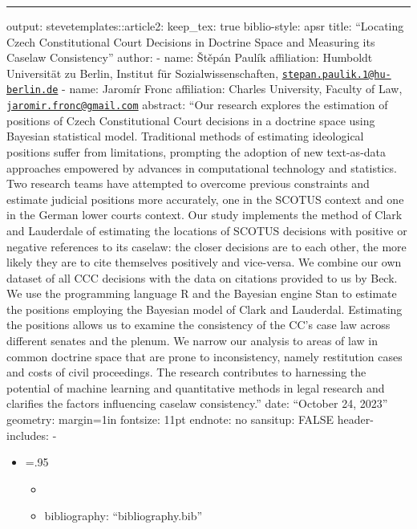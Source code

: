 \documentclass[
]{article}
\author{}
\date{\vspace{-2.5em}}
\providecommand{\tightlist}{%
  \setlength{\itemsep}{0pt}\setlength{\parskip}{0pt}}
\begin{document}
\begin{center}\rule{0.5\linewidth}{0.5pt}\end{center}

output: stevetemplates::article2: keep\_tex: true biblio-style: apsr
title: ``Locating Czech Constitutional Court Decisions in Doctrine Space
and Measuring its Caselaw Consistency'' author: - name: Štěpán Paulík
affiliation: Humboldt Universität zu Berlin, Institut für
Sozialwissenschaften,
\href{mailto:stepan.paulik.1@hu-berlin.de}{\nolinkurl{stepan.paulik.1@hu-berlin.de}}
- name: Jaromír Fronc affiliation: Charles University, Faculty of Law,
\href{mailto:jaromir.fronc@gmail.com}{\nolinkurl{jaromir.fronc@gmail.com}}
abstract: ``Our research explores the estimation of positions of Czech
Constitutional Court decisions in a doctrine space using Bayesian
statistical model. Traditional methods of estimating ideological
positions suffer from limitations, prompting the adoption of new
text-as-data approaches empowered by advances in computational
technology and statistics. Two research teams have attempted to overcome
previous constraints and estimate judicial positions more accurately,
one in the SCOTUS context and one in the German lower courts context.
Our study implements the method of Clark and Lauderdale of estimating
the locations of SCOTUS decisions with positive or negative references
to its caselaw: the closer decisions are to each other, the more likely
they are to cite themselves positively and vice-versa. We combine our
own dataset of all CCC decisions with the data on citations provided to
us by Beck. We use the programming language R and the Bayesian engine
Stan to estimate the positions employing the Bayesian model of Clark and
Lauderdal. Estimating the positions allows us to examine the consistency
of the CC's case law across different senates and the plenum. We narrow
our analysis to areas of law in common doctrine space that are prone to
inconsistency, namely restitution cases and costs of civil proceedings.
The research contributes to harnessing the potential of machine learning
and quantitative methods in legal research and clarifies the factors
influencing caselaw consistency.'' date: ``October 24, 2023'' geometry:
margin=1in fontsize: 11pt endnote: no sansitup: FALSE header-includes: -

\usepackage{longtable}

\begin{itemize}
\tightlist
\item
  \LTcapwidth=.95\textwidth

  \begin{itemize}
  \item
    \linespread{1.05}
  \item
    \usepackage{hyperref}

    bibliography: ``bibliography.bib''
  \end{itemize}
\end{itemize}
\end{document}
